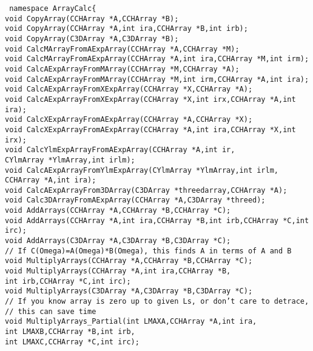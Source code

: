 \documentclass[10pt]{article}
\def\tab{\hspace*{9pt}}
\begin{document}
{\tt
namespace ArrayCalc\{\\
\tab void CopyArray(CCHArray *A,CCHArray *B);\\
\tab void CopyArray(CCHArray *A,int ira,CCHArray *B,int irb);\\
\tab void CopyArray(C3DArray *A,C3DArray *B);\\

\tab void CalcMArrayFromAExpArray(CCHArray *A,CCHArray *M);\\
\tab void CalcMArrayFromAExpArray(CCHArray *A,int ira,CCHArray *M,int irm);\\
\tab void CalcAExpArrayFromMArray(CCHArray *M,CCHArray *A);\\
\tab void CalcAExpArrayFromMArray(CCHArray *M,int irm,CCHArray *A,int ira);\\
\tab void CalcAExpArrayFromXExpArray(CCHArray *X,CCHArray *A);\\
\tab void CalcAExpArrayFromXExpArray(CCHArray *X,int irx,CCHArray *A,int ira);\\
\tab void CalcXExpArrayFromAExpArray(CCHArray *A,CCHArray *X);\\
\tab void CalcXExpArrayFromAExpArray(CCHArray *A,int ira,CCHArray *X,int irx);\\
\tab void CalcYlmExpArrayFromAExpArray(CCHArray *A,int ir,\\
\tab \tab \tab CYlmArray *YlmArray,int irlm);\\
\tab void CalcAExpArrayFromYlmExpArray(CYlmArray *YlmArray,int irlm,\\
\tab \tab \tab CCHArray *A,int ira);\\
\tab void CalcAExpArrayFrom3DArray(C3DArray *threedarray,CCHArray *A);\\
\tab void Calc3DArrayFromAExpArray(CCHArray *A,C3DArray *threed);\\

\tab void AddArrays(CCHArray *A,CCHArray *B,CCHArray *C);\\
\tab void AddArrays(CCHArray *A,int ira,CCHArray *B,int irb,CCHArray *C,int irc);\\
\tab void AddArrays(C3DArray *A,C3DArray *B,C3DArray *C);\\

\tab // If C(Omega)=A(Omega)*B(Omega), this finds A in terms of A and B\\
\tab void MultiplyArrays(CCHArray *A,CCHArray *B,CCHArray *C);\\
\tab void MultiplyArrays(CCHArray *A,int ira,CCHArray *B,\\
\tab \tab \tab int irb,CCHArray *C,int irc);\\
\tab void MultiplyArrays(C3DArray *A,C3DArray *B,C3DArray *C);\\
\tab // If you know array is zero up to given Ls, or don't care to detrace,\\
\tab // this can save time\\
\tab void MultiplyArrays\_Partial(int LMAXA,CCHArray *A,int ira,\\
\tab \tab \tab int LMAXB,CCHArray *B,int irb,\\
\tab \tab \tab int LMAXC,CCHArray *C,int irc);\\

}
\end{document}
